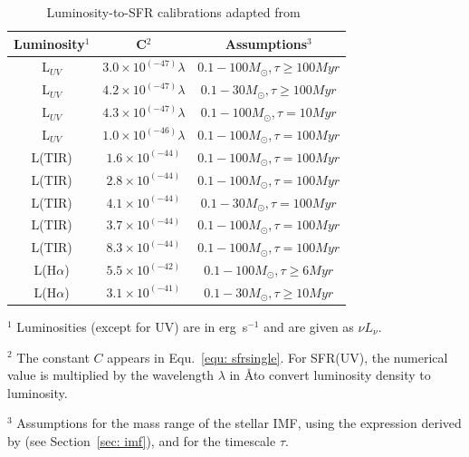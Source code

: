\begin{table}
\caption{Luminosity-to-SFR calibrations adapted from~\cite{Calzetti13}}
\label{table1}
\begin{center}
\begin{tabular}{ c c c }
\hline\hline
Luminosity$^1$ & C$^2$ & Assumptions$^3$\\
\hline
L$_{UV}$ & $3.0 \times 10^{(-47)} \lambda$ &$0.1 -100 M_{\odot}, \tau \ge 100 Myr $\\
L$_{UV}$ & $4.2 \times 10^{(-47)} \lambda$ &$0.1 -30 M_{\odot}, \tau \ge 100 Myr $\\
L$_{UV}$ & $4.3 \times 10^{(-47)}\lambda$ &$0.1 -100 M_{\odot}, \tau = 10 Myr $\\
L$_{UV}$ & $1.0 \times 10^{(-46)}\lambda$ &$0.1 -100 M_{\odot}, \tau = 100 Myr $\\
L(TIR) & $1.6 \times 10^{(-44)}$ &$0.1 -100 M_{\odot}, \tau = 100 Myr $\\
L(TIR) & $2.8 \times 10^{(-44)}$ &$0.1 -100 M_{\odot}, \tau = 100 Myr $\\
L(TIR) & $4.1 \times 10^{(-44)}$ &$0.1 -30 M_{\odot}, \tau = 100 Myr $\\
L(TIR) & $3.7 \times 10^{(-44)}$ &$0.1 -100 M_{\odot}, \tau = 100 Myr $\\
L(TIR) & $8.3 \times 10^{(-44)}$ &$0.1 -100 M_{\odot}, \tau = 100 Myr $\\
L(H${\alpha}$) & $5.5 \times 10^{(-42)}$&$0.1 -100 M_{\odot},  \tau \ge 6 Myr $\\
L(H${\alpha}$) & $3.1 \times 10^{(-41)}$&$0.1 -30 M_{\odot},  \tau \ge 10 Myr $\\
\hline
\end{tabular}
\end{center}
\begin{tablenotes}
\item $^1$ Luminosities (except for UV) are in erg~s$^{-1}$ and are given as $\nu L_{\nu}$.
\item $^2$ The constant $C$ appears in Equ.~\ref{equ: sfrsingle}. For SFR(UV), the numerical value is multiplied by the wavelength $\lambda$ in \AA to convert luminosity density to luminosity. 
\item $^3$ Assumptions for the mass range of the stellar IMF, using the expression derived by \cite{Kroupa01} (see Section~\ref{sec: imf}), and for the timescale $\tau$.
\end{tablenotes}
\end{table}


